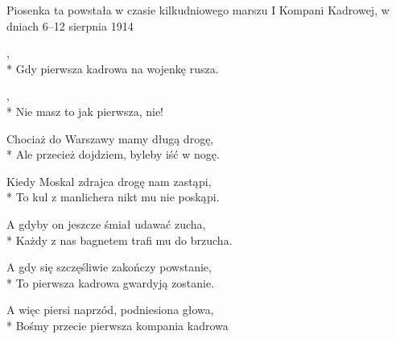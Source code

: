 \begin{info}Piosenka ta powstała w czasie kilkudniowego marszu I Kompani Kadrowej, w dniach 6–12 sierpnia 1914\end{info}

\begin{lyrics}[longestline={Ale przecież dojdziem, byleby iść w nogę.}]

,\\*
Gdy pierwsza kadrowa na wojenkę rusza.

\begin{chorus}
,\\*
Nie masz to jak pierwsza, nie!
\end{chorus}

Chociaż do Warszawy mamy długą drogę,\\*
Ale przecież dojdziem, byleby iść w nogę.

\chorusref

Kiedy Moskal zdrajca drogę nam zastąpi,\\*
To kul z manlichera nikt mu nie poskąpi.

\chorusref

A gdyby on jeszcze śmiał udawać zucha,\\*
Każdy z nas bagnetem trafi mu do brzucha.

\chorusref

A gdy się szczęśliwie zakończy powstanie,\\*
To pierwsza kadrowa gwardyją zostanie.

\chorusref

A więc piersi naprzód, podniesiona głowa,\\*
Bośmy przecie pierwsza kompania kadrowa

\chorusref
\end{lyrics}




